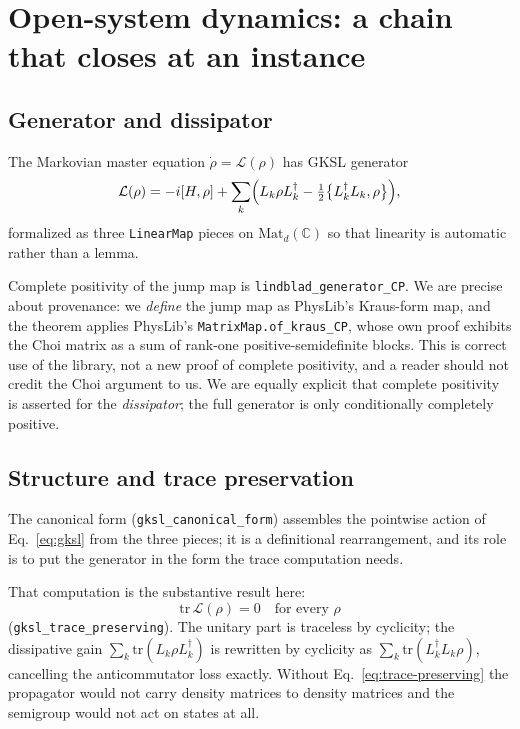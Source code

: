 \documentclass[aps,prd,reprint,nofootinbib,superscriptaddress]{revtex4-2}
\newcommand{\thm}[1]{\texttt{#1}}   %
\begin{document}
\section{Open-system dynamics: a chain that closes at an instance}
\label{sec:lindblad}

\subsection{Generator and dissipator}

The Markovian master equation $\dot\rho=\mathcal{L}(\rho)$ has GKSL generator
\begin{equation}
\mathcal{L}(\rho) = -i[H,\rho] + \sum_{k}\Bigl(L_{k}\rho L_{k}^{\dagger}
- \tfrac{1}{2}\bigl\{L_{k}^{\dagger}L_{k},\rho\bigr\}\Bigr),
\label{eq:gksl}
\end{equation}
formalized as three \texttt{LinearMap} pieces on $\mathrm{Mat}_{d}(\mathbb{C})$ so that linearity is
automatic rather than a lemma.

Complete positivity of the jump map is \thm{lindblad\_generator\_CP}. We are precise about
provenance: we \emph{define} the jump map as PhysLib's Kraus-form map, and the theorem applies
PhysLib's \texttt{MatrixMap.of\_kraus\_CP}, whose own proof exhibits the Choi matrix as a sum of
rank-one positive-semidefinite blocks. This is correct use of the library, not a new proof of
complete positivity, and a reader should not credit the Choi argument to us. We are equally explicit
that complete positivity is asserted for the \emph{dissipator}; the full generator is only
conditionally completely positive.

\subsection{Structure and trace preservation}

The canonical form (\thm{gksl\_canonical\_form}) assembles the pointwise action of
Eq.~\eqref{eq:gksl} from the three pieces; it is a definitional rearrangement, and its role is to put
the generator in the form the trace computation needs.

That computation is the substantive result here:
\begin{equation}
\mathrm{tr}\,\mathcal{L}(\rho) = 0 \quad\text{for every }\rho
\label{eq:trace-preserving}
\end{equation}
(\thm{gksl\_trace\_preserving}). The unitary part is traceless by cyclicity; the dissipative gain
$\sum_{k}\mathrm{tr}(L_{k}\rho L_{k}^{\dagger})$ is rewritten by cyclicity as
$\sum_{k}\mathrm{tr}(L_{k}^{\dagger}L_{k}\rho)$, cancelling the anticommutator loss exactly. Without
Eq.~\eqref{eq:trace-preserving} the propagator would not carry density matrices to density matrices
and the semigroup would not act on states at all.
\end{document}
